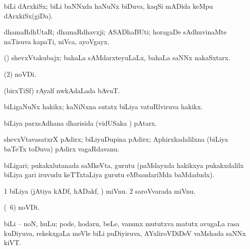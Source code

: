 {{{{{{\bentry
{}
 \gl{\nA}\bmng
biLi dArxkiSx; biLi baNNxda haNuNx biDuva, kaqSi mADida keMpu dArxkiSx(giDa). 
\emng
\eentry

\bentry
{}
 \gl{\nA}\bmng
dhamaRdhUtaR; dhamaRdhavxji; ASADhaBUti; horagaDe sAdhuvinaMte naTisuva kapaTi, niVca, ayoVgayx. 
\emng
\eentry

\bentry
{}
 \gl{\nA}\bmng
(\Kavi) shevxVtakubajx; bahaLa sAMdarxteyuLaLx, bahaLa saNNx nakaSxtarx. 
\emng
\eentry

\bentry
{}
 \gl{\nA}\bmng
{} (\nuga$2$) noVDi. 
\emng
\eentry

\bentry
{}
 \gl{\nA}\bmng
(birxTiSf) rAyalf nwkAdaLada bAvuT. 
\emng
\eentry

\bentry
{}
   \gl{\nA}\bmng
biLigaNuNx hakikx; kaNiNxna sutatx biLiya vatuRlviruva hakikx. 
\emng
\eentry

\bentry
{} 
\gl{\nA}
\expl{}
\bmng
biLiya parxsAdhana dharisida (vidUSaka \mo) pAtarx. 
\emng
\eentry

\bentry
{}
 \gl{\nA}\bmng
shevxVtavasatxrX pAdirx; biLiyuDupina pAdirx; Aphirxkadalilxna (biLiya baTeTx toDuva) pAdirx vagaRdavanu. 
\emng
\eentry

\bentry
{}
 \gl{\nA}\bmng
biLigari; pukakxlutanada saMkeVta, gurutu (paMdayxda hakikxya pukakxdalilx biLiya gari iruvudu keTTxtaLiya gurutu eMbaudariMda baMdadudx). 
\emng
\eentry

\bentry 
{} 
\gl{\nA}
\bmng
\bnum
\num{1} biLiya (jAtiya kADf, hADakf, \mo) miVnu. 
\num{2} saroVvarada miVnu. 
\enum
\emng
\eentry

\bentry
{}
\gl{\nA}
\bmng
{} (\pagu\ $6$) noVDi. 
\emng
\eentry

\bentry
{} 
\gl{\nA}
\bmng
biLi -- noN, huLu; pode, hodaru, beLe, \mo vanunx mututxva matutx avugaLa rasa kuDiyuva, rekekxgaLa meVle biLi puDiyiruva, AYxliroVDiDeV vaMshada saNNx kiVT. 
\emng
\eentry

}}}}}}
